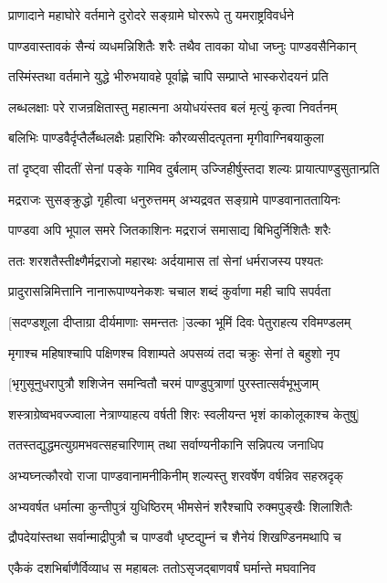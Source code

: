\twolineshloka
{प्राणादाने महाघोरे वर्तमाने दुरोदरे}
{सङ्ग्रामे घोररूपे तु यमराष्ट्रविवर्धने}


\twolineshloka
{पाण्डवास्तावकं सैन्यं व्यधमन्निशितैः शरैः}
{तथैव तावका योधा जघ्नुः पाण्डवसैनिकान्}


\twolineshloka
{तस्मिंस्तथा वर्तमाने युद्धे भीरुभयावहे}
{पूर्वाह्णे चापि सम्प्राप्ते भास्करोदयनं प्रति}


\twolineshloka
{लब्धलक्षाः परे राजन्रक्षितास्तु महात्मना}
{अयोधयंस्तव बलं मृत्युं कृत्वा निवर्तनम्}


\twolineshloka
{बलिभिः पाण्डवैर्दृप्तैर्लैब्धलक्षैः प्रहारिभिः}
{कौरव्यसीदत्पृतना मृगीवाग्निबयाकुला}


\twolineshloka
{तां दृष्ट्वा सीदतीं सेनां पङ्के गामिव दुर्बलाम्}
{उज्जिहीर्षुस्तदा शल्यः प्रायात्पाण्डुसुतान्प्रति}


\twolineshloka
{मद्रराजः सुसङ्क्रुद्धो गृहीत्वा धनुरुत्तमम्}
{अभ्यद्रवत सङ्ग्रामे पाण्डवानाततायिनः}


\twolineshloka
{पाण्डवा अपि भूपाल समरे जितकाशिनः}
{मद्रराजं समासाद्य बिभिदुर्निशितैः शरैः}


\twolineshloka
{ततः शरशतैस्तीक्ष्णैर्मद्रराजो महारथः}
{अर्दयामास तां सेनां धर्मराजस्य पश्यतः}


\twolineshloka
{प्रादुरासन्निमित्तानि नानारूपाण्यनेकशः}
{चचाल शब्दं कुर्वाणा मही चापि सपर्वता}


\twolineshloka
{[सदण्डशूला दीप्ताग्रा दीर्यमाणाः समन्ततः}
{]उल्का भूमिं दिवः पेतुराहत्य रविमण्डलम्}


\twolineshloka
{मृगाश्च महिषाश्चापि पक्षिणश्च विशाम्पते}
{अपसव्यं तदा चक्रुः सेनां ते बहुशो नृप}


\twolineshloka
{[भृगुसूनुधरापुत्रौ शशिजेन समन्वितौ}
{चरमं पाण्डुपुत्राणां पुरस्तात्सर्वभूभुजाम्}


\twolineshloka
{शस्त्राग्रेष्वभवज्ज्वाला नेत्राण्याहत्य वर्षती}
{शिरः स्वलीयन्त भृशं काकोलूकाश्च केतुषु]}


\twolineshloka
{ततस्तद्युद्धमत्युग्रमभवत्सहचारिणाम्}
{तथा सर्वाण्यनीकानि सन्निपत्य जनाधिप}


\twolineshloka
{अभ्यघ्नत्कौरवो राजा पाण्डवानामनीकिनीम्}
{शल्यस्तु शरवर्षेण वर्षन्निव सहस्रदृक्}


\twolineshloka
{अभ्यवर्षत धर्मात्मा कुन्तीपुत्रं युधिष्ठिरम्}
{भीमसेनं शरैश्चापि रुक्मपुङ्खैः शिलाशितैः}


\twolineshloka
{द्रौपदेयांस्तथा सर्वान्माद्रीपुत्रौ च पाण्डवौ}
{धृष्टद्युम्नं च शैनेयं शिखण्डिनमथापि च}


\twolineshloka
{एकैकं दशभिर्बाणैर्विव्याध स महाबलः}
{ततोऽसृजद्बाणवर्षं घर्मान्ते मघवानिव}


